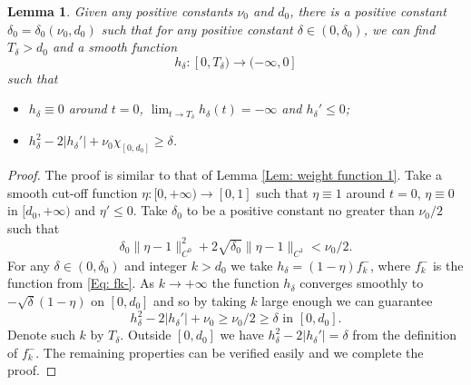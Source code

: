 \documentclass[11pt,letterpaper]{amsart}
\numberwithin{equation}{section}
\newtheorem{lemma}[theorem]{Lemma}
\theoremstyle{definition}
\begin{document}
\begin{lemma}\label{Lem: weight function 2}
Given any positive constants $\nu_0$ and $d_0$, there is a positive constant $\delta_0=\delta_0(\nu_0,d_0)$ such that for any positive constant $\delta\in (0,\delta_0)$, we can find $T_\delta>d_0$ and a smooth function
$$h_\delta:[0,T_\delta)\to (-\infty,0]$$ such that
\begin{itemize}\setlength{\itemsep}{1mm}
\item $h_\delta\equiv 0$ around $t=0$, $\lim_{t\to T_\delta}h_\delta(t)=-\infty$ and $h_\delta'\leq 0$;
\item $h_\delta^2-2|h_\delta'|+\nu_0\chi_{[0,d_0]}\geq \delta$.
\end{itemize}
\end{lemma}
\begin{proof}
The proof is similar to that of Lemma \ref{Lem: weight function 1}. Take a smooth cut-off function $\eta:[0,+\infty)\to [0,1]$ such that $\eta\equiv 1$ around $t=0$, $\eta\equiv 0$ in $[d_0,+\infty)$ and $\eta'\leq 0$. Take $\delta_0$ to be a positive constant no greater than $\nu_0/2$ such that
\begin{equation*}
\delta_0\|\eta-1\|_{C^0}^2+2\sqrt{\delta_0}\|\eta-1\|_{C^1}<\nu_0/2.
\end{equation*}
For any $\delta\in (0,\delta_0)$ and integer $k>d_0$ we take
$
h_{\delta}=(1-\eta)f_k^-
$,
where $f_k^-$ is the function from \eqref{Eq: fk-}. As $k\to +\infty$ the function $h_\delta$ converges smoothly to $-\sqrt\delta (1-\eta)$ {on $[0,d_{0}]$} and so by taking $k$ large enough we can guarantee
$$
h_\delta^2-2|h_\delta'|+\nu_0\geq \nu_0/2\geq\delta\mbox{ in }[0,d_0].
$$
Denote such $k$ by $T_{\delta}$. Outside $[0,d_0]$ we have $h_\delta^2-2|h_\delta'|=\delta$ from the definition of $f_k^-$.
The remaining properties can be verified easily and we complete the proof.
\end{proof}
\end{document}
